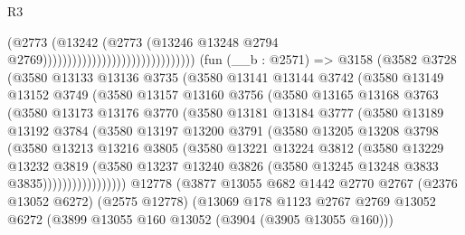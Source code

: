 \begin{lexlean}{R3}
\begin{coremodule}
                                                          (@2773
                                                            (@13242
                                                              (@2773
                                                                (@13246
                                                                  @13248
                                                                  @2794
                                                                  @2769)))))))))))))))))))))))))))))))
    (fun (__b : @2571) =>
    @3158
      (@3582
        @3728
        (@3580
          @13133
          @13136
          @3735
          (@3580
            @13141
            @13144
            @3742
            (@3580
              @13149
              @13152
              @3749
              (@3580
                @13157
                @13160
                @3756
                (@3580
                  @13165
                  @13168
                  @3763
                  (@3580
                    @13173
                    @13176
                    @3770
                    (@3580
                      @13181
                      @13184
                      @3777
                      (@3580
                        @13189
                        @13192
                        @3784
                        (@3580
                          @13197
                          @13200
                          @3791
                          (@3580
                            @13205
                            @13208
                            @3798
                            (@3580
                              @13213
                              @13216
                              @3805
                              (@3580
                                @13221
                                @13224
                                @3812
                                (@3580
                                  @13229
                                  @13232
                                  @3819
                                  (@3580
                                    @13237
                                    @13240
                                    @3826
                                    (@3580 @13245 @13248 @3833 @3835)))))))))))))))))
    @12778
    (@3877
      @13055
      @682
      @1442
      @2770
      @2767
      (@2376 @13052 @6272)
      (@2575 @12778)
      (@13069
        @178
        @1123
        @2767
        @2769
        @13052
        @6272
        (@3899 @13055 @160 @13052 (@3904 (@3905 @13055 @160)))

\end{coremodule}
\end{lexlean}
